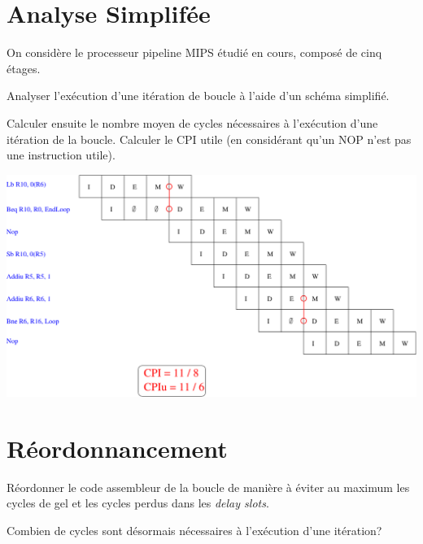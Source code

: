 \begin{correction}
\end{correction}

%
%

\section{Analyse Simplif\'ee}

On consid\`ere le processeur pipeline MIPS \'etudi\'e en cours, compos\'e
de cinq \'etages.

Analyser l'ex\'ecution d'une it\'eration de boucle \`a l'aide d'un
sch\'ema simplifi\'e.

Calculer ensuite le nombre moyen de cycles n\'ecessaires \`a
l'ex\'ecution d'une it\'eration de la boucle. Calculer le CPI utile
(en consid\'erant qu'un NOP n'est pas une instruction utile).

\begin{correction}

  \begin{center}
    \includegraphics[scale=0.7]{figures/correction-analyse-simplifiee.pdf}
  \end{center}

\end{correction}

%
%

\section{R\'eordonnancement}

R\'eordonner le code assembleur de la boucle de mani\`ere \`a \'eviter
au maximum les cycles de gel et les cycles perdus dans les \textit{delay slots}.

Combien de cycles sont d\'esormais n\'ecessaires \`a l'ex\'ecution d'une
it\'eration?

